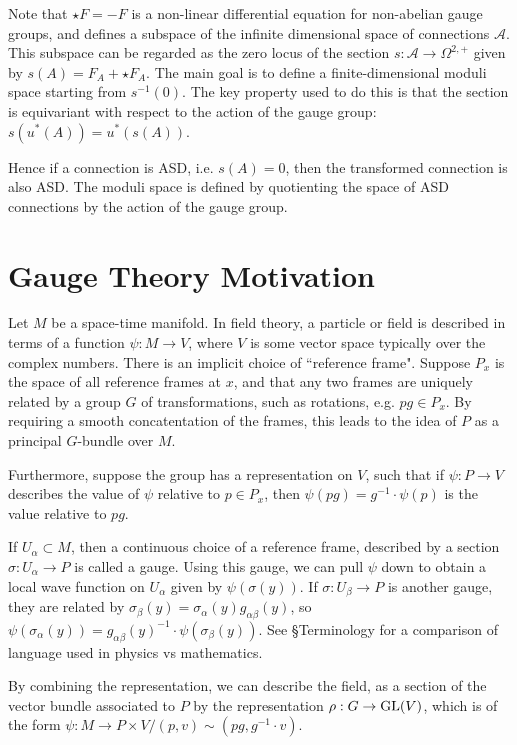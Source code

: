 Note that $\star F = - F$ is a non-linear differential equation for
non-abelian gauge groups, and defines a subspace of the infinite dimensional
space of connections $\mathcal{A}$. This subspace can be regarded as the zero
locus of the section $s : \mathcal{A} \to \Omega^{2,+}$ given by $s(A) =
F_A+\star F_A$. The main goal is to define a finite-dimensional moduli space
starting from  $s^{-1}(0)$. 
The key property used to do this is that the section is equivariant with respect
to the action of the gauge group: $s(u^*(A))=u^*(s(A))$.

Hence if a connection is ASD, i.e. $s(A)=0$, then the transformed connection is
also ASD. The moduli space is defined by quotienting the space of ASD
connections by the action of the gauge group. 

\section{Gauge Theory Motivation}
Let $M$ be a space-time manifold. In field theory, a particle or field is 
described in terms of a function $\psi:M\to V$, where  $V$ is some vector
space typically over the complex numbers. There is an implicit choice of
``reference frame". Suppose  $P_x$ is the space of all reference frames at $x$, and
that any two frames are uniquely related by a group  $G$ of transformations,
such as rotations, e.g. $pg\in P_x$. 
By requiring a smooth concatentation of the frames, this leads to the idea of $P$ as a
 principal $G$-bundle over  $M$.

Furthermore, suppose the group has a representation
on $V$, such that if  $\psi:P\to V$ describes the value of  $\psi$ relative to
$p\in P_x$, then $\psi(pg)=g^{-1}\cdot\psi(p)$ is the value relative to $pg$. 

If  $U_{\alpha}\subset M$, then a continuous choice of a reference frame, described by a
section $\sigma:U_{\alpha}\to P$ is called a gauge. Using this gauge, we can pull $\psi$
down to obtain a local wave function on $U_{\alpha}$ given by
$\psi(\sigma(y))$. If $\sigma:U_{\beta}\to P$ is another gauge, they are related
by $\sigma_\beta(y) = \sigma_\alpha(y)g_{\alpha\beta}(y)$, so
$\psi(\sigma_\alpha(y))=g_{\alpha\beta}(y)^{-1}\cdot\psi(\sigma_\beta(y))$.
See \S Terminology for a comparison of language used in physics vs mathematics. 

By combining the representation, we can describe the field, as a section of
the vector bundle associated to $P$ by the representation  $\rho:G\to \operatorname{GL}(V)$,
which is of the form $\psi:M\to P\times V / (p,v) \sim (pg, g^{-1}\cdot v)$. 

